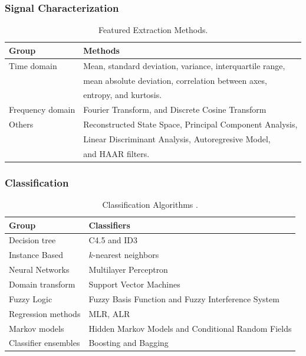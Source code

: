\documentclass{beamer}
\theoremstyle{definition}
\begin{document}
\begin{bibunit}[apalike]
\begin{frame}
\frametitle{Signal Characterization}

\begin{table}[h]
 \label{t:typesofHAR}
\scriptsize{
\begin{tabular}{|l|l |}
\hline
\textbf{Group}& \textbf{Methods} \\ \hline
Time domain & Mean, standard deviation, variance, interquartile range,\\
        & mean absolute deviation, correlation between axes,\\
        & entropy, and kurtosis. \\ \hline  
Frequency domain & Fourier Transform, and Discrete Cosine Transform \\ \hline  
Others & Reconstructed State Space, Principal Component Analysis, \\
      & Linear Discriminant Analysis, Autoregresive Model, \\
      & and HAAR filters.\\ \hline
\end{tabular}}
\caption{Featured Extraction Methods\cite{Lara2013}.}
\end{table}
\end{frame}
\end{bibunit}



\begin{frame}
\frametitle{Classification}

\begin{table}[h]
\label{t:typesofHAR}
\scriptsize{
\begin{tabular}{|l|l |}
\hline
\textbf{Group }& \textbf{Classifiers} \\ \hline
Decision tree & C4.5 and ID3   \\ \hline  
Instance Based & $k$-nearest neighbors \\ \hline  
Neural Networks & Multilayer Perceptron \\ \hline  
Domain transform & Support Vector Machines \\ \hline  
Fuzzy Logic & Fuzzy Basis Function and Fuzzy Interference System \\ \hline  
Regression methods & MLR, ALR \\ \hline  
Markov models & Hidden Markov Models and Conditional Random Fields \\ \hline  
Classifier ensembles & Boosting and Bagging  \\ \hline  
\end{tabular}}
\caption{Classification Algorithms \cite{Lara2013}.}
\end{table}
\end{frame}
\end{document}
